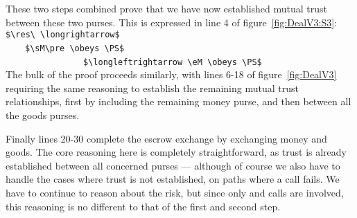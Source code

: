 \vspace*{1cm}  
 
These two steps combined prove that we have now established 
mutual trust between these two purses.  This is expressed in
line 4 of
figure~\ref{fig:DealV3:S3}:\\
\mbox{\lstinline+$\res\ \longrightarrow$+}\\
\mbox{~~~~\lstinline+$\sM\pre \obeys \PS$+}\\
\mbox{~~~~~~~~~~~~~~~~\lstinline+$\longleftrightarrow \eM \obeys \PS$+}\\
\noindent The bulk of the proof proceeds similarly, with lines 6-18 of
figure~\ref{fig:DealV3}
requiring the same reasoning to establish the remaining mutual trust
relationships, first by including the remaining money purse, and then
between all the goods purses. 

Finally lines 20-30 complete the escrow exchange by exchanging money
and goods.  The core reasoning here is completely straightforward, as
trust is already established between all concerned purses --- although
of course we also have to handle the cases where trust is not
established, on paths where a  call fails. We have to
continue to reason about the risk, but since only  and
 calls are involved, this reasoning is no different to
that of the first and second step.

